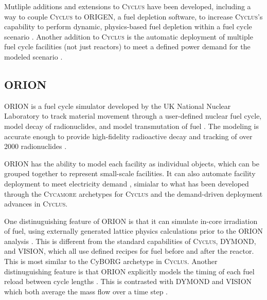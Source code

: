 \documentclass{article}
\newcommand{\Cyclus}{\textsc{Cyclus}\xspace}%
\newcommand{\Cycamore}{\textsc{Cycamore}\xspace}%
\begin{document}
    Mutliple additions and extensions to \Cyclus have been developed, including 
    a way to couple \Cyclus to ORIGEN, a fuel depletion software, to increase
    \Cyclus's capability to perform dynamic, physics-based fuel depletion 
    within a fuel cycle scenario \cite{skutnik_cyborg:_2016}. Another 
    addition to \Cyclus is the automatic deployment of multiple fuel 
    cycle facilities (not just reactors) to meet a defined power demand 
    for the modeled scenario \cite{chee_demand-driven_2020}.    





    \subsection{ORION}
    ORION is a fuel cycle simulator developed by the UK National Nuclear 
    Laboratory to track material movement through a user-defined nuclear 
    fuel cycle, model decay of radionuclides, and model transmutation of fuel
    \cite{gregg_analysis_2012}. The modeling is accurate enough to provide 
    high-fidelity radioactive decay and tracking of over 2000 radionuclides
    \cite{feng_standardized_2016}. 
    
    ORION has the ability to model each facility 
    as individual objects, which can be grouped together to represent small-scale 
    facilities. It can also automate facility deployment to meet electricity demand
    \cite{feng_standardized_2016}, simialar to what has been developed through 
    the \Cycamore archetypes for \Cyclus \cite{scopatz_cyclus_2015} and 
    the demand-driven deployment advances in \Cyclus \cite{chee_demand-driven_2020}.  
    
    One distinuguishing feature of ORION is that 
    it can simulate in-core irradiation of fuel, using externally 
    generated lattice physics calculations prior to the ORION analysis
    \cite{feng_standardized_2016}. This is different from the standard 
    capabilities of \Cyclus, \gls{DYMOND}, and \gls{VISION}, which all use defined 
    recipes for fuel before and after the reactor. This is most similar to 
    the CyBORG archetype in \Cyclus \cite{skutnik_cyborg:_2016}. Another 
    distinuguishing feature is that ORION explicitly models the timing of 
    each fuel reload between cycle lengths \cite{feng_standardized_2016}.
    This is contrasted with \gls{DYMOND} and \gls{VISION} which both average
    the mass flow over a time step \cite{feng_standardized_2016}.
\end{document}
